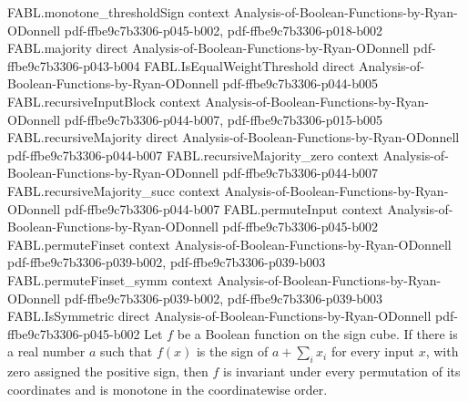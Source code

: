 \begin{theorem}
\proofstep
  {FABL.monotone_thresholdSign}
  {context}
  {Analysis-of-Boolean-Functions-by-Ryan-ODonnell}
  {pdf-ffbe9c7b3306-p045-b002,
    pdf-ffbe9c7b3306-p018-b002}
\proofstep
  {FABL.majority}
  {direct}
  {Analysis-of-Boolean-Functions-by-Ryan-ODonnell}
  {pdf-ffbe9c7b3306-p043-b004}
\proofstep
  {FABL.IsEqualWeightThreshold}
  {direct}
  {Analysis-of-Boolean-Functions-by-Ryan-ODonnell}
  {pdf-ffbe9c7b3306-p044-b005}
\proofstep
  {FABL.recursiveInputBlock}
  {context}
  {Analysis-of-Boolean-Functions-by-Ryan-ODonnell}
  {pdf-ffbe9c7b3306-p044-b007,
    pdf-ffbe9c7b3306-p015-b005}
\proofstep
  {FABL.recursiveMajority}
  {direct}
  {Analysis-of-Boolean-Functions-by-Ryan-ODonnell}
  {pdf-ffbe9c7b3306-p044-b007}
\proofstep
  {FABL.recursiveMajority_zero}
  {context}
  {Analysis-of-Boolean-Functions-by-Ryan-ODonnell}
  {pdf-ffbe9c7b3306-p044-b007}
\proofstep
  {FABL.recursiveMajority_succ}
  {context}
  {Analysis-of-Boolean-Functions-by-Ryan-ODonnell}
  {pdf-ffbe9c7b3306-p044-b007}
\proofstep
  {FABL.permuteInput}
  {context}
  {Analysis-of-Boolean-Functions-by-Ryan-ODonnell}
  {pdf-ffbe9c7b3306-p045-b002}
\proofstep
  {FABL.permuteFinset}
  {context}
  {Analysis-of-Boolean-Functions-by-Ryan-ODonnell}
  {pdf-ffbe9c7b3306-p039-b002,
    pdf-ffbe9c7b3306-p039-b003}
\proofstep
  {FABL.permuteFinset_symm}
  {context}
  {Analysis-of-Boolean-Functions-by-Ryan-ODonnell}
  {pdf-ffbe9c7b3306-p039-b002,
    pdf-ffbe9c7b3306-p039-b003}
\proofstep
  {FABL.IsSymmetric}
  {direct}
  {Analysis-of-Boolean-Functions-by-Ryan-ODonnell}
  {pdf-ffbe9c7b3306-p045-b002}
Let $f$ be a Boolean function on the sign cube. If there is a real number $a$ such that
$f(x)$ is the sign of $a+\sum_i x_i$ for every input $x$, with zero assigned the
positive sign, then $f$ is invariant under every permutation of its coordinates and is
monotone in the coordinatewise order.
\end{theorem}

